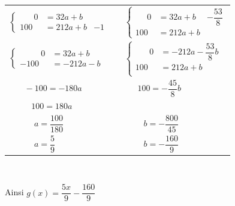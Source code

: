 \begin{enumerate}
\renewcommand{\arraystretch }{1.7}
\begin{tabular}{lcl}
$\left\{ \begin{array}{ll|l} 
      \;\;\;\;\;\; 0  \!\!\!\!\!\!\!\! & = 32a   + b  &  \\
          100   \!\!\!\!\!\!\!\! & = 212 a + b  & -1
          \end{array} \right. $ & \hspace{1cm} 
   & $\left\{ \begin{array}{ll|l} 
                  \;\;\;\; \; 0  \!\!\!\!\!\!\!\!& = 32 a + b  & -\dfrac{53}{8} \\
                      100  \!\!\!\!\!\!\!\!& = 212 a + b & 
              \end{array} \right. $ \\
$\left\{ \begin{array}{ll} 
       \;\;\;\;  \;\;\;\; \; 0  \!\!\!\!\!\!\!\! & = 32 a + b   \\
           -100 \!\!\!\!\!\!\!\! & = -212 a -b 
          \end{array} \right. $ & \hspace{1cm} 
   & $\left\{ \begin{array}{ll} 
                 \;\;\;\;\;\;0   \!\!\!\!\!\!\!\! & = -212a - \dfrac{53}{8} b  \\
                 100  \!\!\!\!\!\!\!\! & = 212a + b \\
               \end{array} \right. $ \\
\cline{1-1} \cline{3-3}
$  \quad  \;\;\;  -100 =  -180a  $ & & $ \quad \;\; 100 = -\dfrac{45}{8} b $\\
$  \quad  \;\;\;\;\; \;  100 =  180a  $ & & \\
$ \qquad \quad    a  =  \dfrac{100}{180} $ & & $ \qquad  \;  b  = -\dfrac{800}{45}$\\
$ \qquad \quad   a  =  \dfrac{5}{9} $ & & $ \qquad \;  b  =  -\dfrac{160}{9}$\\
\end{tabular}   \\
\renewcommand{\arraystretch }{1}
 
 
 
Ainsi         $g(x) = \dfrac{5x}{9} -\dfrac{160}{9} $ \\  
 
\end{enumerate}



